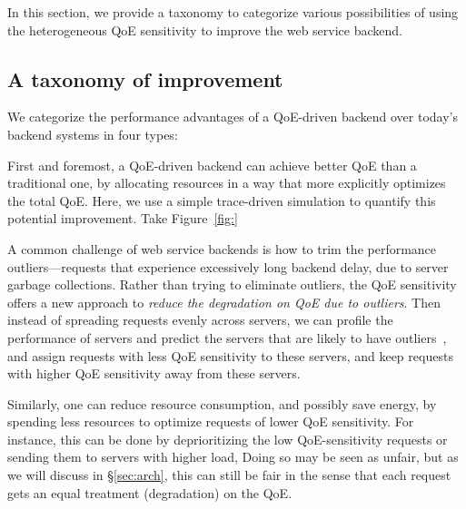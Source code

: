 In this section, we provide a taxonomy to categorize various possibilities of using the heterogeneous QoE sensitivity to improve the web service backend.%

\subsection{A taxonomy of improvement}

We categorize the performance advantages of a QoE-driven backend over today's backend systems in four types:

First and foremost, a QoE-driven backend can achieve better QoE than a traditional one, by allocating resources in a way that more explicitly optimizes the total QoE. 
Here, we use a simple trace-driven simulation to quantify this potential improvement. 
Take Figure~\ref{fig:}
    
A common challenge of web service backends is how to trim the performance outliers---requests that experience excessively long backend delay, \eg due to server garbage collections. 
Rather than trying to eliminate outliers, the QoE sensitivity offers a new approach to {\em reduce the degradation on QoE due to outliers}.
Then instead of spreading requests evenly across servers, we can profile the performance of servers and predict the servers that are likely to have outliers~\cite{ganesh's trimming}, and assign requests with less QoE sensitivity to these servers, and keep requests with higher QoE sensitivity away from these servers. 
    
Similarly, one can reduce resource consumption, and possibly save energy, by spending less resources to optimize requests of lower QoE sensitivity. For instance, this can be done by deprioritizing the low QoE-sensitivity requests or sending them to servers with higher load, 
Doing so may be seen as unfair, but as we will discuss in \S\ref{sec:arch}, this can still be fair in the sense that each request gets an equal treatment (degradation) on the QoE.
    
